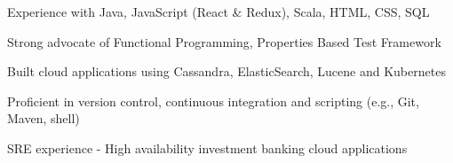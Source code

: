 \begin{cvitems}
\sectionspace
\sectionspace
\vspace{1mm}
	\fontsize{11pt}{1.4em}\bodyfontlight\upshape\color{text}
        \item {Experience with Java, JavaScript (React \& Redux), Scala, HTML, CSS, SQL}
        \item {Strong advocate of Functional Programming, Properties Based Test Framework}
        \item {Built cloud applications using Cassandra, ElasticSearch, Lucene and Kubernetes}
        \item {Proficient in version control, continuous integration and scripting (e.g., Git, Maven, shell)}
        \item {SRE experience - High availability investment banking cloud applications}
        \end{cvitems}
\vspace{1mm}
\sectionspace
